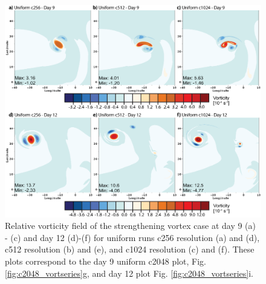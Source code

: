 \documentclass{ametsoc}
\begin{document}
\begin{figure}
   \centerline{%
   \noindent
   \includegraphics[width=\textwidth]{Figures/uni_runs_day9n12-01}}
   \caption{Relative vorticity field of the 
   strengthening vortex case at day 9 (a) - (c) and day 12 (d)-(f) for uniform runs 
   c256 resolution (a) and (d), c512 resolution (b) and (e), and 
   c1024 resolution (c) and (f). These plots
   correspond to the day 9 uniform c2048 plot, Fig. \ref{fig:c2048_vortseries}g, and
   day 12 plot Fig. \ref{fig:c2048_vortseries}i.
   }
   \label{fig:uni_d9nd12}
\end{figure}
\end{document}
